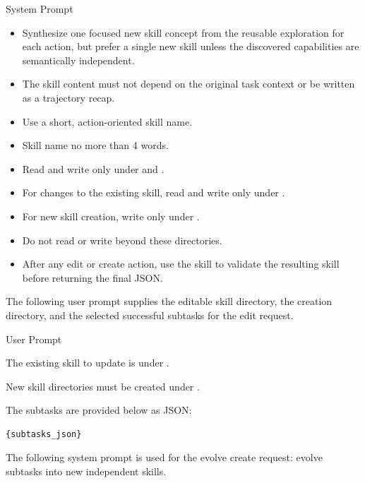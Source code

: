 \begin{svpromptbox}{System Prompt}
\begin{itemize}
\item Synthesize one focused new skill concept from the reusable exploration for each  action, but prefer a single new skill unless the discovered capabilities are semantically independent.
\item The skill content must not depend on the original task context or be written as a trajectory recap.
\item Use a short, action-oriented skill name.
\item Skill name no more than 4 words.
\end{itemize}
\smallskip
{}
\smallskip
\begin{itemize}
\item Read and write only under  and .
\item For changes to the existing skill, read and write only under .
\item For new skill creation, write only under .
\item Do not read or write beyond these directories.
\item After any edit or create action, use the  skill to validate the resulting skill before returning the final JSON.
\end{itemize}

\end{svpromptbox}

\noindent The following user prompt supplies the editable skill directory, the creation directory, and the selected successful subtasks for the edit request.\par

\begin{svpromptbox}{User Prompt}

The existing skill to update is under .\par
New skill directories must be created under .\par
\smallskip
The subtasks are provided below as JSON:\par
\smallskip
\begin{lstlisting}[style=svpromptcode]
{subtasks_json}
\end{lstlisting}

\end{svpromptbox}

\noindent The following system prompt is used for the evolve create request: evolve subtasks into new independent skills.\par

